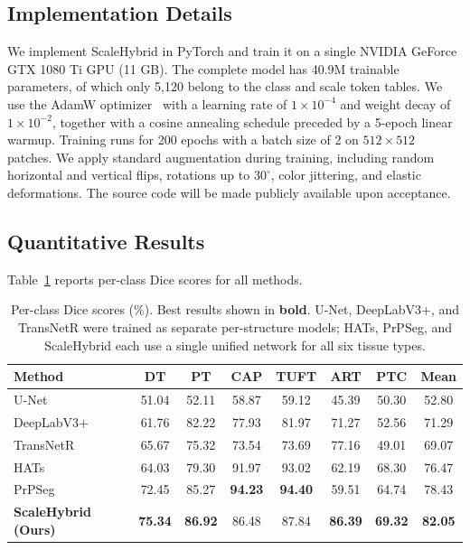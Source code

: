 \documentclass[runningheads]{llncs}
\begin{document}
\subsection{Implementation Details}

We implement ScaleHybrid in PyTorch and train it on a single NVIDIA GeForce GTX 1080 Ti GPU (11 GB). The complete model has 40.9M trainable parameters, of which only 5,120 belong to the class and scale token tables. We use the AdamW optimizer~\cite{loshchilov2019adamw} with a learning rate of $1 \times 10^{-4}$ and weight decay of $1 \times 10^{-2}$, together with a cosine annealing schedule preceded by a 5-epoch linear warmup. Training runs for 200 epochs with a batch size of 2 on $512 \times 512$ patches. We apply standard augmentation during training, including random horizontal and vertical flips, rotations up to $30^\circ$, color jittering, and elastic deformations. The source code will be made publicly available upon acceptance.

\subsection{Quantitative Results}

Table~\ref{tab:results_dice} reports per-class Dice scores for all methods.

\begin{table}[htbp]
    \caption{Per-class Dice scores (\%). Best results shown in \textbf{bold}. U-Net, DeepLabV3+, and TransNetR were trained as separate per-structure models; HATs, PrPSeg, and ScaleHybrid each use a single unified network for all six tissue types.}\label{tab:results_dice}
    \centering
    \begin{tabular}{lccccccc}
        \toprule
        \textbf{Method} & \textbf{DT} & \textbf{PT} & \textbf{CAP} & \textbf{TUFT} & \textbf{ART} & \textbf{PTC} & \textbf{Mean} \\
        \midrule
        U-Net & 51.04 & 52.11 & 58.87 & 59.12 & 45.39 & 50.30 & 52.80 \\
        DeepLabV3+ & 61.76 & 82.22 & 77.93 & 81.97 & 71.27 & 52.56 & 71.29 \\
        TransNetR & 65.67 & 75.32 & 73.54 & 73.69 & 77.16 & 49.01 & 69.07 \\
        HATs & 64.03 & 79.30 & 91.97 & 93.02 & 62.19 & 68.30 & 76.47 \\
        PrPSeg & 72.45 & 85.27 & \textbf{94.23} & \textbf{94.40} & 59.51 & 64.74 & 78.43 \\
        \midrule
        \textbf{ScaleHybrid (Ours)} & \textbf{75.34} & \textbf{86.92} & 86.48 & 87.84 & \textbf{86.39} & \textbf{69.32} & \textbf{82.05} \\
        \bottomrule
    \end{tabular}
\end{table}
\end{document}
